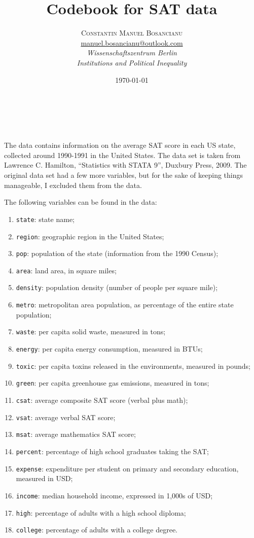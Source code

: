 \documentclass[a4paper, 11pt]{article}
\title{\textbf{Codebook for SAT data}}
\author{\textsc{Constantin Manuel Bosancianu}\\ %
  \href{mailto:manuel.bosancianu@outlook.com}{manuel.bosancianu@outlook.com}\\
  \textit{Wissenschaftszentrum Berlin}\\
  \textit{Institutions and Political Inequality}} %
\date{\today} %
\makeatletter
\renewcommand{\maketitle}{
  \begin{flushleft}
    {\huge\@title}\\
    \vspace{10pt}
    {\large\@author}\\
    \vspace{10pt}
    {\@date}
    \vspace{40pt}
  \end{flushleft}
}
\makeatother
\begin{document}
\maketitle

The data contains information on the average SAT score in each US state, collected around 1990-1991 in the United States. The data set is taken from Lawrence C. Hamilton, ``Statistics with STATA 9'', Duxbury Press, 2009. The original data set had a few more variables, but for the sake of keeping things manageable, I excluded them from the data.

The following variables can be found in the data:

\begin{enumerate}
\item \texttt{state}: state name;
\item \texttt{region}: geographic region in the United States;
\item \texttt{pop}: population of the state (information from the 1990 Census);
\item \texttt{area}: land area, in square miles;
\item \texttt{density}: population density (number of people per square mile);
\item \texttt{metro}: metropolitan area population, as percentage of the entire state population;
\item \texttt{waste}: per capita solid waste, measured in tons;
\item \texttt{energy}: per capita energy consumption, measured in BTUs;
\item \texttt{toxic}: per capita toxins released in the environments, measured in pounds;
\item \texttt{green}: per capita greenhouse gas emissions, measured in tons;
\item \texttt{csat}: average composite SAT score (verbal plus math);
\item \texttt{vsat}: average verbal SAT score;
\item \texttt{msat}: average mathematics SAT score;
\item \texttt{percent}: percentage of high school graduates taking the SAT;
\item \texttt{expense}: expenditure per student on primary and secondary education, measured in USD;
\item \texttt{income}: median household income, expressed in 1,000s of USD;
\item \texttt{high}: percentage of adults with a high school diploma;
\item \texttt{college}: percentage of adults with a college degree.
\end{enumerate}
\end{document}
